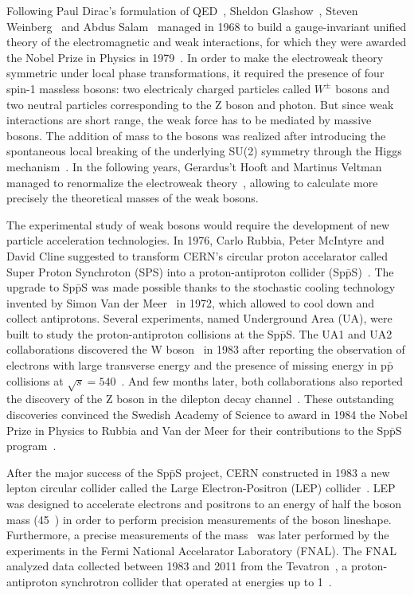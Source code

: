 Following Paul Dirac's formulation of QED~\cite{DiracQED}, Sheldon Glashow~\cite{Glashow:1959wxa}, Steven Weinberg~\cite{Weinberg:1967tq} and Abdus Salam~\cite{Salam:1968rm} managed in 1968 to build a gauge-invariant unified theory of the electromagnetic and weak interactions, for which they were awarded the Nobel Prize in Physics in 1979~\cite{Nobel1979}. In order to make the electroweak theory symmetric under local phase transformations, it required the presence of four spin-1 massless bosons: two electricaly charged particles called $W^{\pm}$ bosons and two neutral particles corresponding to the Z boson and photon. But since weak interactions are short range, the weak force has to be mediated by massive bosons. The addition of mass to the bosons was realized after introducing the spontaneous local breaking of the underlying SU(2) symmetry through the Higgs mechanism~\cite{HiggsMechanism_1,HiggsMechanism_2}. In the following years, Gerardus't Hooft and Martinus Veltman managed to renormalize the electroweak theory~\cite{Renormalization_1,Renormalization_2}, allowing to calculate more precisely the theoretical masses of the weak bosons.

The experimental study of weak bosons would require the development of new particle acceleration technologies. In 1976, Carlo Rubbia, Peter McIntyre and David Cline suggested to transform CERN's circular proton accelarator called Super Proton Synchroton (SPS) into a proton-antiproton collider (Sp$\bar{\mathrm{p}}$S)~\cite{SppS}. The upgrade to Sp$\bar{\mathrm{p}}$S was made possible thanks to the stochastic cooling technology invented by Simon Van der Meer~\cite{StochasticCooling} in 1972, which allowed to cool down and collect antiprotons. Several experiments, named Underground Area (UA), were built to study the proton-antiproton collisions at the Sp$\bar{\mathrm{p}}$S. The UA1 and UA2 collaborations discovered the W boson~\cite{W_UA1,W_UA2} in 1983 after reporting the observation of electrons with large transverse energy and the presence of missing energy in p$\bar{\mathrm{p}}$ collisions at $\sqrt{s}=540$~\GeV. And few months later, both collaborations also reported the discovery of the Z boson in the dilepton decay channel~\cite{Z_UA1,Z_UA2}. These outstanding discoveries convinced the Swedish Academy of Science to award in 1984 the Nobel Prize in Physics to Rubbia and Van der Meer for their contributions to the Sp$\bar{\mathrm{p}}$S program~\cite{Nobel1984}.

After the major success of the Sp$\bar{\mathrm{p}}$S project, CERN constructed in 1983 a new lepton circular collider called the Large Electron-Positron (LEP) collider~\cite{LEP}. LEP was designed to accelerate electrons and positrons to an energy of half the {\PZ} boson mass (45~\GeV) in order to perform precision measurements of the {\PZ} boson lineshape. Furthermore, a precise measurements of the {\PW} mass~\cite{WMass_D0} was later performed by the experiments in the Fermi National Accelarator Laboratory (FNAL). The FNAL analyzed data collected between 1983 and 2011 from the Tevatron~\cite{Tevatron}, a proton-antiproton synchrotron collider that operated at energies up to 1~\TeV.

